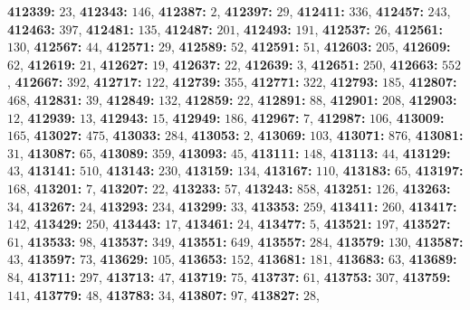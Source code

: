 \textsf{\bfseries 412339:} $23$, \textsf{\bfseries 412343:} $146$, \textsf{\bfseries 412387:} $2$, \textsf{\bfseries 412397:} $29$, \textsf{\bfseries 412411:} $336$, \textsf{\bfseries 412457:} $243$, \textsf{\bfseries 412463:} $397$, \textsf{\bfseries 412481:} $135$, \textsf{\bfseries 412487:} $201$, \textsf{\bfseries 412493:} $191$, \textsf{\bfseries 412537:} $26$, \textsf{\bfseries 412561:} $130$, \textsf{\bfseries 412567:} $44$, \textsf{\bfseries 412571:} $29$, \textsf{\bfseries 412589:} $52$, \textsf{\bfseries 412591:} $51$, \textsf{\bfseries 412603:} $205$, \textsf{\bfseries 412609:} $62$, \textsf{\bfseries 412619:} $21$, \textsf{\bfseries 412627:} $19$, \textsf{\bfseries 412637:} $22$, \textsf{\bfseries 412639:} $3$, \textsf{\bfseries 412651:} $250$, \textsf{\bfseries 412663:} $552$, \textsf{\bfseries 412667:} $392$, \textsf{\bfseries 412717:} $122$, \textsf{\bfseries 412739:} $355$, \textsf{\bfseries 412771:} $322$, \textsf{\bfseries 412793:} $185$, \textsf{\bfseries 412807:} $468$, \textsf{\bfseries 412831:} $39$, \textsf{\bfseries 412849:} $132$, \textsf{\bfseries 412859:} $22$, \textsf{\bfseries 412891:} $88$, \textsf{\bfseries 412901:} $208$, \textsf{\bfseries 412903:} $12$, \textsf{\bfseries 412939:} $13$, \textsf{\bfseries 412943:} $15$, \textsf{\bfseries 412949:} $186$, \textsf{\bfseries 412967:} $7$, \textsf{\bfseries 412987:} $106$, \textsf{\bfseries 413009:} $165$, \textsf{\bfseries 413027:} $475$, \textsf{\bfseries 413033:} $284$, \textsf{\bfseries 413053:} $2$, \textsf{\bfseries 413069:} $103$, \textsf{\bfseries 413071:} $876$, \textsf{\bfseries 413081:} $31$, \textsf{\bfseries 413087:} $65$, \textsf{\bfseries 413089:} $359$, \textsf{\bfseries 413093:} $45$, \textsf{\bfseries 413111:} $148$, \textsf{\bfseries 413113:} $44$, \textsf{\bfseries 413129:} $43$, \textsf{\bfseries 413141:} $510$, \textsf{\bfseries 413143:} $230$, \textsf{\bfseries 413159:} $134$, \textsf{\bfseries 413167:} $110$, \textsf{\bfseries 413183:} $65$, \textsf{\bfseries 413197:} $168$, \textsf{\bfseries 413201:} $7$, \textsf{\bfseries 413207:} $22$, \textsf{\bfseries 413233:} $57$, \textsf{\bfseries 413243:} $858$, \textsf{\bfseries 413251:} $126$, \textsf{\bfseries 413263:} $34$, \textsf{\bfseries 413267:} $24$, \textsf{\bfseries 413293:} $234$, \textsf{\bfseries 413299:} $33$, \textsf{\bfseries 413353:} $259$, \textsf{\bfseries 413411:} $260$, \textsf{\bfseries 413417:} $142$, \textsf{\bfseries 413429:} $250$, \textsf{\bfseries 413443:} $17$, \textsf{\bfseries 413461:} $24$, \textsf{\bfseries 413477:} $5$, \textsf{\bfseries 413521:} $197$, \textsf{\bfseries 413527:} $61$, \textsf{\bfseries 413533:} $98$, \textsf{\bfseries 413537:} $349$, \textsf{\bfseries 413551:} $649$, \textsf{\bfseries 413557:} $284$, \textsf{\bfseries 413579:} $130$, \textsf{\bfseries 413587:} $43$, \textsf{\bfseries 413597:} $73$, \textsf{\bfseries 413629:} $105$, \textsf{\bfseries 413653:} $152$, \textsf{\bfseries 413681:} $181$, \textsf{\bfseries 413683:} $63$, \textsf{\bfseries 413689:} $84$, \textsf{\bfseries 413711:} $297$, \textsf{\bfseries 413713:} $47$, \textsf{\bfseries 413719:} $75$, \textsf{\bfseries 413737:} $61$, \textsf{\bfseries 413753:} $307$, \textsf{\bfseries 413759:} $141$, \textsf{\bfseries 413779:} $48$, \textsf{\bfseries 413783:} $34$, \textsf{\bfseries 413807:} $97$, \textsf{\bfseries 413827:} $28$, 
